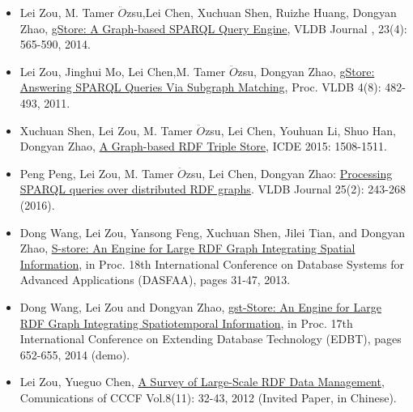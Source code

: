 \documentclass[titlepage, a4paper, 12pt]{article}
\begin{document}
\begin{itemize}
\item
  Lei Zou, M. Tamer $\ddot{O}$zsu,Lei Chen, Xuchuan Shen, Ruizhe Huang, Dongyan
  Zhao,
  \href{http://www.icst.pku.edu.cn/intro/leizou/projects/papers/gStoreVLDBJ.pdf}{gStore:
  A Graph-based SPARQL Query Engine}, VLDB Journal , 23(4): 565-590,
  2014.
\item
  Lei Zou, Jinghui Mo, Lei Chen,M. Tamer $\ddot{O}$zsu, Dongyan Zhao,
  \href{http://www.icst.pku.edu.cn/intro/leizou/projects/papers/p482-zou.pdf}{gStore:
  Answering SPARQL Queries Via Subgraph Matching}, Proc. VLDB 4(8):
  482-493, 2011.
\item
  Xuchuan Shen, Lei Zou, M. Tamer $\ddot{O}$zsu, Lei Chen, Youhuan Li, Shuo Han,
  Dongyan Zhao,
  \href{http://www.icst.pku.edu.cn/intro/leizou/projects/papers/demo.pdf}{A
  Graph-based RDF Triple Store}, ICDE 2015: 1508-1511.
\item
  Peng Peng, Lei Zou, M. Tamer $\ddot{O}$zsu, Lei Chen, Dongyan Zhao: \href{http://arxiv.org/pdf/1411.6763v4.pdf}{Processing
  SPARQL queries over distributed RDF graphs}. VLDB Journal 25(2): 243-268 (2016).
\item
  Dong Wang, Lei Zou, Yansong Feng, Xuchuan Shen, Jilei Tian, and
  Dongyan Zhao,
  \href{http://www.icst.pku.edu.cn/intro/leizou/projects/papers/Store.pdf}{S-store:
  An Engine for Large RDF Graph Integrating Spatial Information}, in
  Proc. 18th International Conference on Database Systems for Advanced
  Applications (DASFAA), pages 31-47, 2013.
\item
  Dong Wang, Lei Zou and Dongyan Zhao,
  \href{http://www.icst.pku.edu.cn/intro/leizou/projects/papers/edbtdemo2014.pdf}{gst-Store:
  An Engine for Large RDF Graph Integrating Spatiotemporal Information},
  in Proc. 17th International Conference on Extending Database
  Technology (EDBT), pages 652-655, 2014 (demo).
\item
  Lei Zou, Yueguo Chen,
  \href{http://www.icst.pku.edu.cn/intro/leizou/documentation/pdf/2012CCCF.pdf}{A
  Survey of Large-Scale RDF Data Management}, Comunications of CCCF
  Vol.8(11): 32-43, 2012 (Invited Paper, in Chinese).
\end{itemize}

\clearpage

\end{document}
